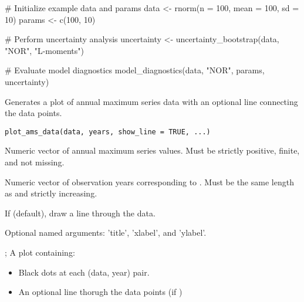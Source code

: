 \documentclass[a4paper]{book}
\begin{document}
%
\begin{Examples}
\begin{ExampleCode}
# Initialize example data and params
data <- rnorm(n = 100, mean = 100, sd = 10)
params <- c(100, 10)

# Perform uncertainty analysis
uncertainty <- uncertainty_bootstrap(data, "NOR", "L-moments")

# Evaluate model diagnostics
model_diagnostics(data, "NOR", params, uncertainty)

\end{ExampleCode}
\end{Examples}
%
\begin{Description}
Generates a plot of annual maximum series data with an optional line connecting
the data points.
\end{Description}
%
\begin{Usage}
\begin{verbatim}
plot_ams_data(data, years, show_line = TRUE, ...)
\end{verbatim}
\end{Usage}
%
\begin{Arguments}
\begin{ldescription}
\item[\code{data}] Numeric vector of annual maximum series values.
Must be strictly positive, finite, and not missing.

\item[\code{years}] Numeric vector of observation years corresponding to .
Must be the same length as  and strictly increasing.

\item[\code{show\_line}] If  (default), draw a line through the data.

\item[\code{...}] Optional named arguments: 'title', 'xlabel', and 'ylabel'.
\end{ldescription}
\end{Arguments}
%
\begin{Value}
; A plot containing:
\begin{itemize}

\item{} Black dots at each (data, year) pair.
\item{} An optional line thorugh the data points (if )

\end{itemize}

\end{Value}
\end{document}

